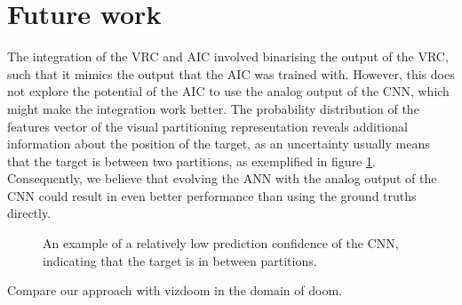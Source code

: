 \section{Future work}
\label{sec:futurework}
The integration of the VRC and AIC involved binarising the output of the VRC, such that it mimics the output that the AIC was trained with. However, this does not explore the potential of the AIC to use the analog output of the CNN, which might make the integration work better. The probability distribution of the features vector of the visual partitioning representation reveals additional information about the position of the target, as an uncertainty usually means that the target is between two partitions, as exemplified in figure \ref{fig:uncertain}. Consequently, we believe that evolving the ANN with the analog output of the CNN could result in even better performance than using the ground truths directly.

\begin{figure}[H]
	\centering
	\begin{scriptsize}
		\sffamily
		
	\end{scriptsize}
	\caption{An example of a relatively low prediction confidence of the CNN, indicating that the target is in between partitions.}
	\label{fig:uncertain}
\end{figure}

Compare our approach with vizdoom in the domain of doom.